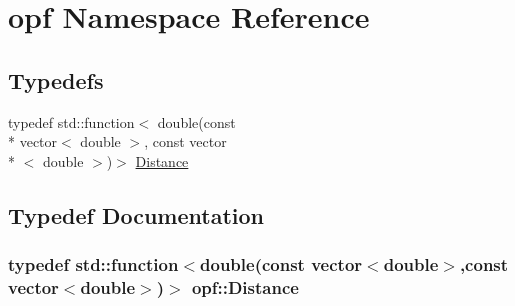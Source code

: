 \hypertarget{namespaceopf}{\section{opf Namespace Reference}
\label{namespaceopf}
}
\subsection*{Typedefs}
\begin{DoxyCompactItemize}
\item 
typedef std\+::function$<$ double(const \\*
vector$<$ double $>$, const vector\\*
$<$ double $>$)$>$ \hyperlink{namespaceopf_a61631393754e0aa6aaeacf0767b2b419}{Distance}
\end{DoxyCompactItemize}


\subsection{Typedef Documentation}
\hypertarget{namespaceopf_a61631393754e0aa6aaeacf0767b2b419}{
\subsubsection[{Distance}]{\setlength{\rightskip}{0pt plus 5cm}typedef std\+::function$<$double(const vector$<$double$>$,const vector$<$double$>$)$>$ {\bf opf\+::\+Distance}}}\label{namespaceopf_a61631393754e0aa6aaeacf0767b2b419}
